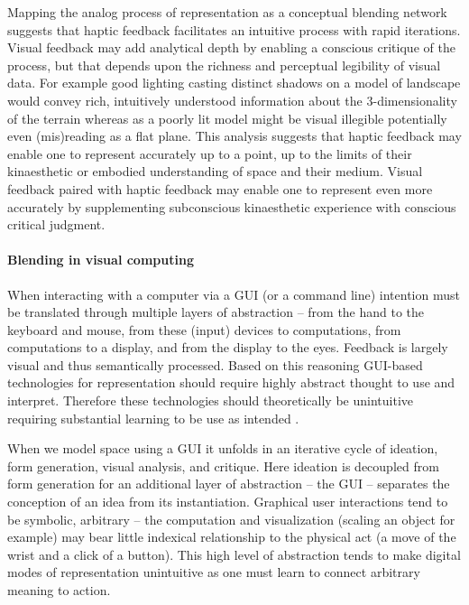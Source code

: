 \documentclass{article}
\begin{document}
Mapping the analog process of representation as a conceptual blending network suggests that haptic feedback facilitates an intuitive process with rapid iterations. Visual feedback may add analytical depth by enabling a conscious critique of the process, but that depends upon the richness and perceptual legibility of visual data. For example good lighting casting distinct shadows on a model of landscape would convey rich, intuitively understood information about the 3-dimensionality of the terrain whereas as a poorly lit model might be visual illegible potentially even (mis)reading as a flat plane. This analysis suggests that haptic feedback may enable one to represent accurately up to a point, up to the limits of their kinaesthetic or embodied understanding of space and their medium. Visual feedback paired with haptic feedback may enable one to represent even more accurately by supplementing subconscious kinaesthetic experience with conscious critical judgment. 




\paragraph{Blending in visual computing} %
When interacting with a computer via a GUI (or a command line) intention must be translated through multiple layers of abstraction -- from the hand to the keyboard and mouse, from these (input) devices to computations, from computations to a display, and from the display to the eyes. Feedback is largely visual and thus semantically processed. 
Based on this reasoning GUI-based technologies for representation should require highly abstract thought to use and interpret. Therefore these technologies should theoretically be unintuitive requiring substantial learning to be use as intended \citep{Ishii2008}.

When we model space using a GUI it unfolds in an iterative cycle of ideation, form generation, visual analysis, and critique. Here ideation is decoupled from form generation for an additional layer of abstraction -- the GUI -- separates the conception of an idea from its instantiation. 
Graphical user interactions tend to be symbolic, arbitrary -- the computation and visualization (scaling an object for example) may bear little indexical relationship to the physical act (a move of the wrist and a click of a button). This high level of abstraction tends to make digital modes of representation unintuitive as one must learn to connect arbitrary meaning to action. 
\end{document}

